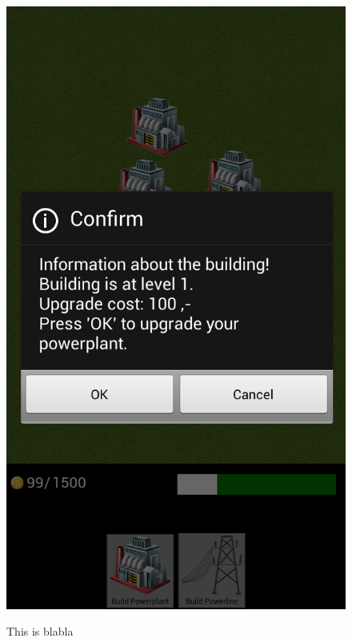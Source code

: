 \begin{figure}[H]
{		\includegraphics[scale=0.17]{pictures/sprint2-screen/sprint2-12}
	}
	\caption{This is blabla}
	\end{figure}


